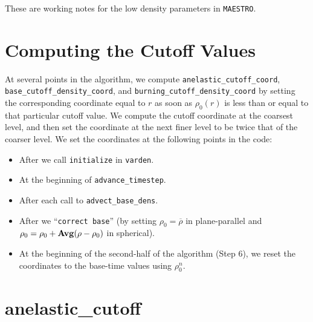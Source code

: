 These are working notes for the low density parameters in {\tt MAESTRO}.

\section{Computing the Cutoff Values}

At several points in the algorithm, we compute {\tt anelastic\_cutoff\_coord}, 
{\tt base\_cutoff\_density\_coord}, and {\tt burning\_cutoff\_density\_coord} by 
setting the corresponding coordinate equal to $r$ as soon as $\rho_0(r)$ is less than 
or equal to that particular cutoff value.  We compute the cutoff coordinate at the
coarsest level, and then set the coordinate at the next finer level to be twice that
of the coarser level.  We set the coordinates at the following points in the code:

\begin{itemize}

\item After we call {\tt initialize} in {\tt varden}.

\item At the beginning of {\tt advance\_timestep}.

\item After each call to {\tt advect\_base\_dens}.

\item After we ``{\tt correct base}'' (by setting $\rho_0 = \overline{\rho}$ in
  plane-parallel and $\rho_0 = \rho_0 + {\bf{Avg}}(\rho - \rho_0)$ in spherical).

\item At the beginning of the second-half of the algorithm (Step 6), we reset
  the coordinates to the base-time values using $\rho_0^n$.

\end{itemize}

\section{anelastic\_cutoff}\label{Sec:Anelastic Cutoff}

